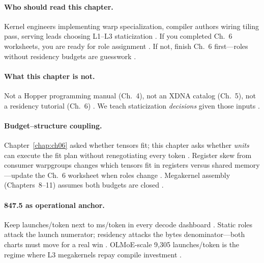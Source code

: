 \paragraph{Who should read this chapter.}
Kernel engineers implementing warp specialization, compiler authors wiring tiling pass, serving leads choosing L1--L3 staticization \citep{shah2024flashattention3,yirage2026,mpk2025,patel2025llminference}.
If you completed Ch.~6 worksheets, you are ready for role assignment \citep{dao2022flashattention,chen2020compilerbasedhardw}.
If not, finish Ch.~6 first---roles without residency budgets are guesswork \citep{memoryfloor2026,yirage2026,taxbreak2026}.

\paragraph{What this chapter is not.}
Not a Hopper programming manual (Ch.~4), not an XDNA catalog (Ch.~5), not a residency tutorial (Ch.~6) \citep{nvidia2022hopper,amd2024xdna,chen2020compilerbasedhardw}.
We teach staticization \emph{decisions} given those inputs \citep{yirage2026,dlbook}.

\paragraph{Budget--structure coupling.}
Chapter~\ref{chap:ch06} asked whether tensors fit; this chapter asks whether \emph{units} can execute the fit plan without renegotiating every token \citep{yirage2026,shah2024flashattention3,dao2022flashattention}.
Register skew from consumer warpgroups changes which tensors fit in registers versus shared memory---update the Ch.~6 worksheet when roles change \citep{memoryfloor2026,chen2020compilerbasedhardw}.
Megakernel assembly (Chapters~8--11) assumes both budgets are closed \citep{mpk2025,wu2024mirage,semianalysis2024tma}.

\paragraph{847.5 as operational anchor.}
Keep launches/token next to ms/token in every decode dashboard \citep{taxbreak2026,patel2025llminference}.
Static roles attack the launch numerator; residency attacks the bytes denominator---both charts must move for a real win \citep{memoryfloor2026,dao2022flashattention,yirage2026}.
OLMoE-scale 9{,}305 launches/token is the regime where L3 megakernels repay compile investment \citep{taxbreak2026,mpk2025}.

